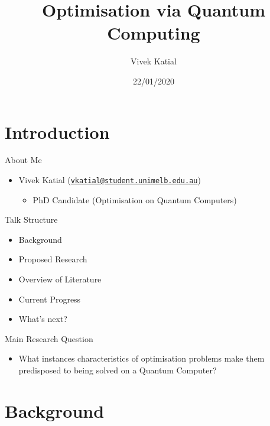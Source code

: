\documentclass[
  ignorenonframetext,
]{beamer}
\title{Optimisation via Quantum Computing}
\author{Vivek Katial}
\date{22/01/2020}
\providecommand{\tightlist}{%
  \setlength{\itemsep}{0pt}\setlength{\parskip}{0pt}}
\begin{document}
\frame{\titlepage}

\hypertarget{introduction}{%
\section{Introduction}\label{introduction}}

\begin{frame}{About Me}
\protect\hypertarget{about-me}{}

\begin{itemize}
\tightlist
\item
  Vivek Katial
  (\href{mailto:vkatial@student.unimelb.edu.au}{\nolinkurl{vkatial@student.unimelb.edu.au}})

  \begin{itemize}
  \tightlist
  \item
    PhD Candidate (Optimisation on Quantum Computers)
  \end{itemize}
\end{itemize}

\end{frame}

\begin{frame}{Talk Structure}
\protect\hypertarget{talk-structure}{}

\begin{itemize}
\tightlist
\item
  Background
\item
  Proposed Research
\item
  Overview of Literature
\item
  Current Progress
\item
  What's next?
\end{itemize}

\end{frame}

\begin{frame}{Main Research Question}
\protect\hypertarget{main-research-question}{}

\begin{itemize}
\tightlist
\item
  What instances characteristics of optimisation problems make them
  predisposed to being solved on a Quantum Computer?
\end{itemize}

\end{frame}

\hypertarget{background}{%
\section{Background}\label{background}}
\end{document}
